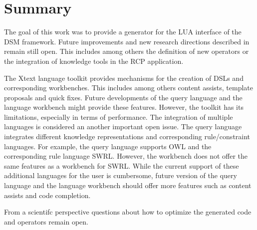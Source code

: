 \section{Summary}
The goal of this work was to provide a generator for the LUA interface of the
DSM framework. Future improvements and new research directions described in  
\cite{297:Frey2010} remain still open. This includes among others the definition
of new operators or the integration of knowledge tools in the RCP application. 

The Xtext language toolkit provides mechanisms for the creation of DSLs
and corresponding workbenches. This includes among others content assists, 
template proposals and quick fixes. Future developments of the query language 
and the language workbench might provide these features. However, the toolkit 
has its limitations, especially in terms of performance. The integration of 
multiple languages is considered an another important open issue. The query
language integrates different knowledge representations and corresponding 
rule/constraint languages. For example, the query language supports OWL and the
corresponding rule language SWRL. However, the workbench does not offer the same
features as a workbench for SWRL. While the current support of these additional
languages for the user is cumbersome, future version of the query language and 
the language workbench should offer more features such as content assists and 
code completion.

From a scientifc perspective questions about how to optimize the generated code
and operators remain open. 
